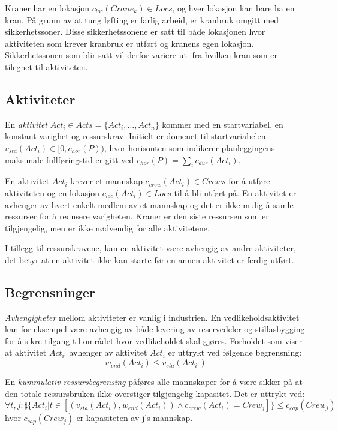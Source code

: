 Kraner har en lokasjon $ c_{loc}(Crane_{k}) \in Locs $, og hver lokasjon kan bare ha en kran. På grunn av at tung løfting er farlig arbeid, er kranbruk omgitt med sikkerhetssoner. Disse sikkerhetssonene er satt til både lokasjonen hvor aktiviteten som krever kranbruk er utført og kranens egen lokasjon. Sikkerhetssonen som blir satt vil derfor variere ut ifra hvilken kran som er tilegnet til aktiviteten.

\subsection{Aktiviteter}
En \textit{aktivitet} $ Act_{i} \in Acts = \{ Act_{i},\dots,Act_{n} \} $ kommer med en startvariabel, en konstant varighet og ressurskrav. Initielt er domenet til startvariabelen $ v_{sta}(Act_{i}) \in [ 0, c_{hor}(P)) $, hvor horisonten som indikerer planleggingens maksimale fullføringstid er gitt ved $ c_{hor}(P) = \sum_{i} c_{dur}(Act_{i}) $.

En aktivitet $ Act_{i} $ krever et mannskap $ c_{crew}(Act_{i}) \in Crews $ for å utføre aktiviteten og en lokasjon $ c_{loc}(Act_{i}) \in Locs $ til å bli utført på. En aktivitet er avhenger av hvert enkelt medlem av et mannskap og det er ikke mulig å samle ressurser for å redusere varigheten. Kraner er den siste ressursen som er tilgjengelig, men er ikke nødvendig for alle aktivitetene.

I tillegg til ressurskravene, kan en aktivitet være avhengig av andre aktiviteter, det betyr at en aktivitet ikke kan starte før en annen aktivitet er ferdig utført.

\subsection{Begrensninger}
\textit{Avhengigheter} mellom aktiviteter er vanlig i industrien. En vedlikeholdsaktivitet kan for eksempel være avhengig av både levering av reservedeler og stillasbygging for å sikre tilgang til området hvor vedlikeholdet skal gjøres. Forholdet som viser at aktivitet $ Act_{i'} $ avhenger av aktivitet $ Act_{i} $ er uttrykt ved følgende begrensning: 
\begin{equation}
w_{end}(Act_{i}) \leq v_{sta}(Act_{i'})
\end{equation}

En \textit{kummulativ ressursbegrensing} påføres alle mannskaper for å være sikker på at den totale ressursbruken ikke overstiger tilgjengelig kapasitet. Det er uttrykt ved: 
\begin{equation}
\forall t,j : \sharp \{ Act_{i} | t \in [(v_{sta}(Act_{i}), w_{end}(Act_{i})) \wedge c_{crew}(Act_{i}) = Crew_{j}] \} \leq c_{cap}(Crew_{j})
\end{equation}
hvor $ c_{cap}(Crew_{j}) $ er kapasiteten av j's mannskap.

